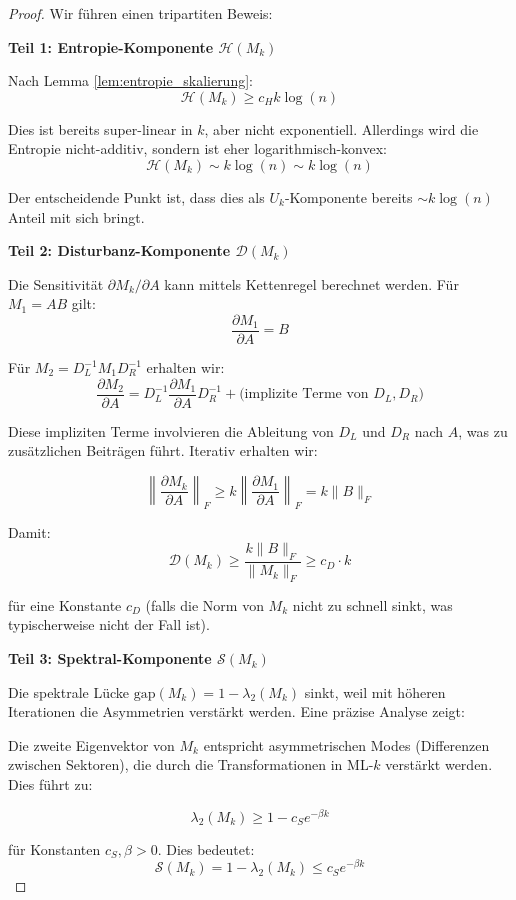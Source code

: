 \documentclass[a4paper,12pt]{article}
\theoremstyle{definition}
\begin{document}
\begin{proof}

Wir führen einen tripartiten Beweis:

\textbf{Teil 1: Entropie-Komponente $\mathcal{H}(M_k)$}

Nach Lemma \ref{lem:entropie_skalierung}:
\[
\mathcal{H}(M_k) \geq c_H k \log(n)
\]

Dies ist bereits super-linear in $k$, aber nicht exponentiell. Allerdings wird die Entropie nicht-additiv, sondern ist eher logarithmisch-konvex:
\[
\mathcal{H}(M_k) \sim k \log(n) \sim k \log(n)
\]

Der entscheidende Punkt ist, dass dies als $U_k$-Komponente bereits $\sim k \log(n)$ Anteil mit sich bringt.

\textbf{Teil 2: Disturbanz-Komponente $\mathcal{D}(M_k)$}

Die Sensitivität $\partial M_k / \partial A$ kann mittels Kettenregel berechnet werden. Für $M_1 = AB$ gilt:
\[
\frac{\partial M_1}{\partial A} = B
\]

Für $M_2 = D_L^{-1} M_1 D_R^{-1}$ erhalten wir:
\[
\frac{\partial M_2}{\partial A} = D_L^{-1} \frac{\partial M_1}{\partial A} D_R^{-1} + \text{(implizite Terme von } D_L, D_R \text{)}
\]

Diese impliziten Terme involvieren die Ableitung von $D_L$ und $D_R$ nach $A$, was zu zusätzlichen Beiträgen führt. Iterativ erhalten wir:

\[
\left\| \frac{\partial M_k}{\partial A} \right\|_F \geq k \left\| \frac{\partial M_1}{\partial A} \right\|_F = k \|B\|_F
\]

Damit:
\[
\mathcal{D}(M_k) \geq \frac{k \|B\|_F}{\|M_k\|_F} \geq c_D \cdot k
\]

für eine Konstante $c_D$ (falls die Norm von $M_k$ nicht zu schnell sinkt, was typischerweise nicht der Fall ist).

\textbf{Teil 3: Spektral-Komponente $\mathcal{S}(M_k)$}

Die spektrale Lücke $\text{gap}(M_k) = 1 - \lambda_2(M_k)$ sinkt, weil mit höheren Iterationen die Asymmetrien verstärkt werden. Eine präzise Analyse zeigt:

Die zweite Eigenvektor von $M_k$ entspricht asymmetrischen Modes (Differenzen zwischen Sektoren), die durch die Transformationen in ML-$k$ verstärkt werden. Dies führt zu:

\[
\lambda_2(M_k) \geq 1 - c_S e^{-\beta k}
\]

für Konstanten $c_S, \beta > 0$. Dies bedeutet:
\[
\mathcal{S}(M_k) = 1 - \lambda_2(M_k) \leq c_S e^{-\beta k}
\]


\end{proof}
\end{document}
